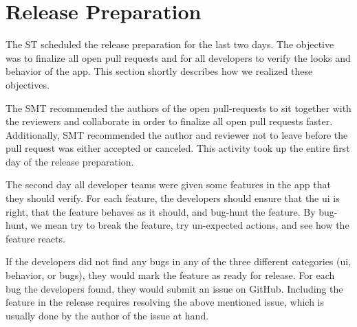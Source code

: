 \section{Release Preparation}
The \gls{ST} scheduled the release preparation for the last two days. The objective was to finalize all open pull requests and for all developers to verify the looks and behavior of the app. This section shortly describes how we realized these objectives.

The \gls{SMT} recommended the authors of the open pull-requests to sit together with the reviewers and collaborate in order to finalize all open pull requests faster. Additionally, \gls{SMT} recommended the author and reviewer not to leave before the pull request was either accepted or canceled. This activity took up the entire first day of the release preparation.

The second day all developer teams were given some features in the app that they should verify. For each feature, the developers should ensure that the \gls{ui} is right, that the feature behaves as it should, and bug-hunt the feature. By bug-hunt, we mean try to break the feature, try un-expected actions, and see how the feature reacts.

If the developers did not find any bugs in any of the three different categories (\gls{ui}, behavior, or bugs), they would mark the feature as ready for release. For each bug the developers found, they would submit an issue on GitHub. Including the feature in the release requires resolving the above mentioned issue, which is usually done by the author of the issue at hand.